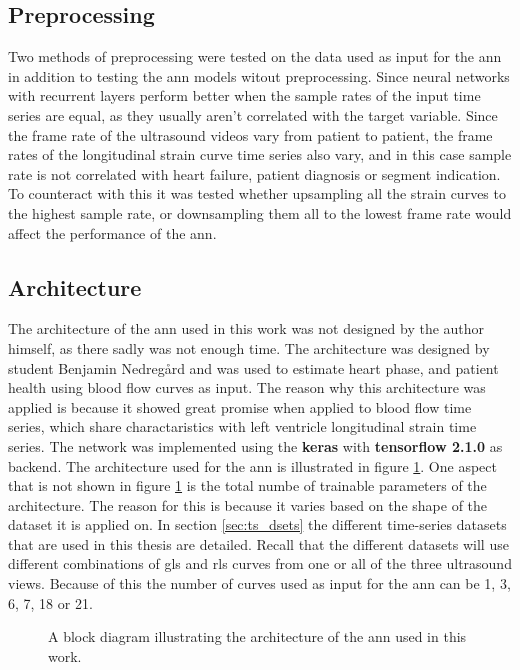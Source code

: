 \subsection{Preprocessing}

Two methods of preprocessing were tested on the data used as input for the \acrshort{ann} in addition to testing the \acrshort{ann} models witout preprocessing. Since neural networks with recurrent layers perform better when the sample rates of the input time series are equal, as they usually aren't correlated with the target variable. Since the frame rate of the ultrasound videos vary from patient to patient, the frame rates of the longitudinal strain curve time series also vary, and in this case sample rate is not correlated with heart failure, patient diagnosis or segment indication. To counteract with this it was tested whether upsampling all the strain curves to the highest sample rate, or downsampling them all to the lowest frame rate would affect the performance of the \acrshort{ann}. 

\subsection{Architecture}

The architecture of the \acrshort{ann} used in this work was not designed by the author himself, as there sadly was not enough time. The architecture was designed by student Benjamin Nedregård and was used to estimate heart phase, and patient health using blood flow curves as input. The reason why this architecture was applied is because it showed great promise when applied to blood flow time series, which share charactaristics with left ventricle longitudinal strain time series. The network was implemented using the \textbf{keras} with \textbf{tensorflow 2.1.0} as backend. The architecture used for the \acrshort{ann} is illustrated in figure \ref{fig:nn_arch}. One aspect that is not shown in figure \ref{fig:nn_arch} is the total numbe of trainable parameters of the architecture. The reason for this is because it varies based on the shape of the dataset it is applied on. In section \ref{sec:ts_dsets} the different time-series datasets that are used in this thesis are detailed. Recall that the different datasets will use different combinations of \acrshort{gls} and \acrshort{rls} curves from one or all of the three ultrasound views. Because of this the number of curves used as input for the \acrshort{ann} can be 1, 3, 6, 7, 18 or 21.

\begin{figure}
    \centering
    
    \caption{A block diagram illustrating the architecture of the \acrshort{ann} used in this work.}
    \label{fig:nn_arch}
\end{figure}

